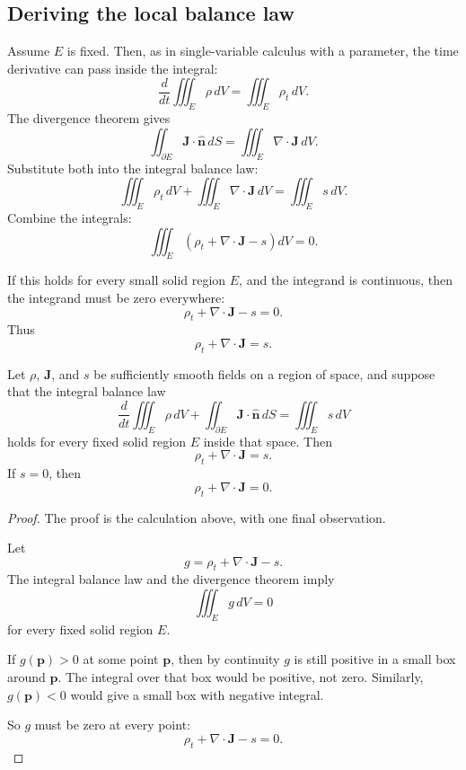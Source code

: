 \subsection{Deriving the local balance law}

Assume \(E\) is fixed.  Then, as in single-variable calculus with a parameter, the time
derivative can pass inside the integral:
\[
    \frac{d}{dt}\iiint_E \rho\,dV
    =
    \iiint_E \rho_t\,dV.
\]
The divergence theorem gives
\[
    \iint_{\partial E}\mathbf J\cdot\widehat{\mathbf n}\,dS
    =
    \iiint_E \nabla\cdot\mathbf J\,dV.
\]
Substitute both into the integral balance law:
\[
    \iiint_E \rho_t\,dV
    +
    \iiint_E \nabla\cdot\mathbf J\,dV
    =
    \iiint_E s\,dV.
\]
Combine the integrals:
\[
\boxed{
    \iiint_E
    \left(
        \rho_t+\nabla\cdot\mathbf J-s
    \right)
    dV
    =
    0.
}
\]

If this holds for every small solid region \(E\), and the integrand is continuous, then
the integrand must be zero everywhere:
\[
\boxed{
    \rho_t+\nabla\cdot\mathbf J-s=0.
}
\]
Thus
\[
\boxed{
    \rho_t+\nabla\cdot\mathbf J=s.
}
\]

\begin{theorem}
Let \(\rho\), \(\mathbf J\), and \(s\) be sufficiently smooth fields on a region of space,
and suppose that the integral balance law
\[
    \frac{d}{dt}\iiint_E \rho\,dV
    +
    \iint_{\partial E}\mathbf J\cdot\widehat{\mathbf n}\,dS
    =
    \iiint_E s\,dV
\]
holds for every fixed solid region \(E\) inside that space.  Then
\[
\boxed{
    \rho_t+\nabla\cdot\mathbf J=s.
}
\]
If \(s=0\), then
\[
\boxed{
    \rho_t+\nabla\cdot\mathbf J=0.
}
\]
\end{theorem}

\begin{proof}
The proof is the calculation above, with one final observation.

Let
\[
    g=\rho_t+\nabla\cdot\mathbf J-s.
\]
The integral balance law and the divergence theorem imply
\[
    \iiint_E g\,dV=0
\]
for every fixed solid region \(E\).

If \(g(\mathbf p)>0\) at some point \(\mathbf p\), then by continuity \(g\) is still
positive in a small box around \(\mathbf p\).  The integral over that box would be
positive, not zero.  Similarly, \(g(\mathbf p)<0\) would give a small box with negative
integral.

So \(g\) must be zero at every point:
\[
    \rho_t+\nabla\cdot\mathbf J-s=0.
\]
\end{proof}

